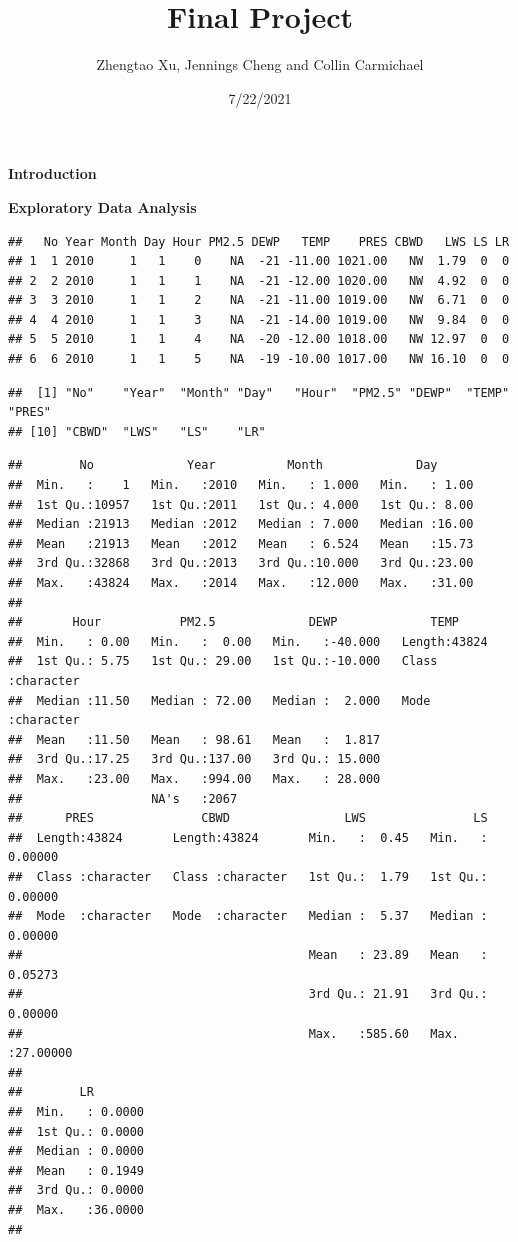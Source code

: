 \documentclass[
]{article}
\title{Final Project}
\author{Zhengtao Xu, Jennings Cheng and Collin Carmichael}
\date{7/22/2021}
\begin{document}
\maketitle

\textbf{Introduction}

\textbf{Exploratory Data Analysis}

\begin{verbatim}
##   No Year Month Day Hour PM2.5 DEWP   TEMP    PRES CBWD   LWS LS LR
## 1  1 2010     1   1    0    NA  -21 -11.00 1021.00   NW  1.79  0  0
## 2  2 2010     1   1    1    NA  -21 -12.00 1020.00   NW  4.92  0  0
## 3  3 2010     1   1    2    NA  -21 -11.00 1019.00   NW  6.71  0  0
## 4  4 2010     1   1    3    NA  -21 -14.00 1019.00   NW  9.84  0  0
## 5  5 2010     1   1    4    NA  -20 -12.00 1018.00   NW 12.97  0  0
## 6  6 2010     1   1    5    NA  -19 -10.00 1017.00   NW 16.10  0  0
\end{verbatim}

\begin{verbatim}
##  [1] "No"    "Year"  "Month" "Day"   "Hour"  "PM2.5" "DEWP"  "TEMP"  "PRES" 
## [10] "CBWD"  "LWS"   "LS"    "LR"
\end{verbatim}

\begin{verbatim}
##        No             Year          Month             Day       
##  Min.   :    1   Min.   :2010   Min.   : 1.000   Min.   : 1.00  
##  1st Qu.:10957   1st Qu.:2011   1st Qu.: 4.000   1st Qu.: 8.00  
##  Median :21913   Median :2012   Median : 7.000   Median :16.00  
##  Mean   :21913   Mean   :2012   Mean   : 6.524   Mean   :15.73  
##  3rd Qu.:32868   3rd Qu.:2013   3rd Qu.:10.000   3rd Qu.:23.00  
##  Max.   :43824   Max.   :2014   Max.   :12.000   Max.   :31.00  
##                                                                 
##       Hour           PM2.5             DEWP             TEMP          
##  Min.   : 0.00   Min.   :  0.00   Min.   :-40.000   Length:43824      
##  1st Qu.: 5.75   1st Qu.: 29.00   1st Qu.:-10.000   Class :character  
##  Median :11.50   Median : 72.00   Median :  2.000   Mode  :character  
##  Mean   :11.50   Mean   : 98.61   Mean   :  1.817                     
##  3rd Qu.:17.25   3rd Qu.:137.00   3rd Qu.: 15.000                     
##  Max.   :23.00   Max.   :994.00   Max.   : 28.000                     
##                  NA's   :2067                                         
##      PRES               CBWD                LWS               LS          
##  Length:43824       Length:43824       Min.   :  0.45   Min.   : 0.00000  
##  Class :character   Class :character   1st Qu.:  1.79   1st Qu.: 0.00000  
##  Mode  :character   Mode  :character   Median :  5.37   Median : 0.00000  
##                                        Mean   : 23.89   Mean   : 0.05273  
##                                        3rd Qu.: 21.91   3rd Qu.: 0.00000  
##                                        Max.   :585.60   Max.   :27.00000  
##                                                                           
##        LR         
##  Min.   : 0.0000  
##  1st Qu.: 0.0000  
##  Median : 0.0000  
##  Mean   : 0.1949  
##  3rd Qu.: 0.0000  
##  Max.   :36.0000  
## 
\end{verbatim}
\end{document}
